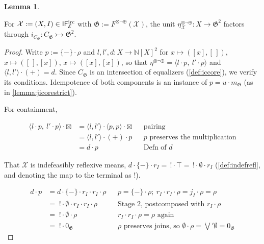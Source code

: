 \documentclass{article}
\makeatletter
\newcommand{\allproofs}{} %
\newif\ifproofsinappendix
\newcommand{\lemmawithproof}[3]{%
  \begin{lemma}\label{#1}
    #2  
    \ifproofsinappendix \hyperref[xxx#1]{(Proof)} \fi
  \end{lemma}
    \ifproofsinappendix
  \g@addto@macro\allproofs{%
    \par\medskip
    \noindent
    \subsection*{\cref{#1}}\par
    #2\par
    \begin{proof}\label{xxx#1}
      #3
    \end{proof}%
  }
      \else

    \begin{proof}
      #3
    \end{proof}
    \fi 
}
\theoremstyle{definition}
\newtheorem{lemma}{Lemma}[section]
\newcommand{\N}{\mathbb{N}}
\newcommand{\G}{\mathfrak{G}}
\newcommand{\cE}{\mathcal{E}}
\newcommand{\cX}{\mathcal{X}}
\newcommand{\cat}[1]{\mathsf{#1}}
\makeatother
\begin{document}
\lemmawithproof{lemma:unitic}{
For $\cX:=(X,I)\in\cat{IF^{\rm irc}_\cE}$ with $\G:=F^{\otimes\neg\oplus}(\cX)$, the unit $\eta^{\otimes\neg\oplus}_{\cX}\colon X\to\G^2$ factors through $i_{C_\G}\colon C_\G\rightarrowtail\G^2$.
}{
Write $p:=\{-\}\cdot\rho$ and $l,l',d\colon X\to\N[X]^2$ for $x\mapsto([x],[\,])$, $x\mapsto([\,],[x])$, $x\mapsto([x],[x])$, so that $\eta^{\otimes\neg\oplus}=\langle l\cdot p,\ l'\cdot p\rangle$ and $\langle l,l'\rangle\cdot(+)=d$. 
Since $C_\G$ is an intersection of equalizers (\cref{def:iccore}), we verify its conditions. Idempotence of both components is an instance of $p=u\cdot m_\G$
(as in \cref{lemma:jicorestrict}). 

For containment, 


\begin{align*}
\langle l\cdot p,\ l'\cdot p\rangle\cdot\boxtimes
&= \langle l,l'\rangle\cdot \langle p,p\rangle \cdot\boxtimes
  && \text{pairing}\\
&= \langle l,l'\rangle\cdot(+)\cdot p
  && p\text{ preserves the multiplication}\\
&= d\cdot p
  && \text{Defn of  } d
\end{align*}


That $\cX$ is indefeasibly reflexive means,  $d\cdot\{-\}\cdot r_I=\,!\cdot\top=\,!\cdot\emptyset\cdot r_I$ (\cref{def:indefrefl}, and denoting the map to the terminal as !). 

\begin{align*}
d\cdot p
&= d\cdot\{-\}\cdot r_I\cdot r_I\cdot\rho
  && p=\{-\}\cdot\rho;\ r_I\cdot r_I\cdot\rho=j_I\cdot\rho=\rho\\
&= \;!\cdot\emptyset\cdot r_I\cdot r_I\cdot\rho
  && \text{Stage 2, postcomposed with }r_I\cdot\rho\\
&= \;!\cdot\emptyset\cdot\rho
  && r_I\cdot r_I\cdot\rho=\rho\text{ again}\\
&= \;!\cdot 0_\G
  && \rho\text{ preserves joins, so }\emptyset\cdot\rho=\textstyle\bigvee'\emptyset=0_\G
\end{align*}
}
 
\end{document}
